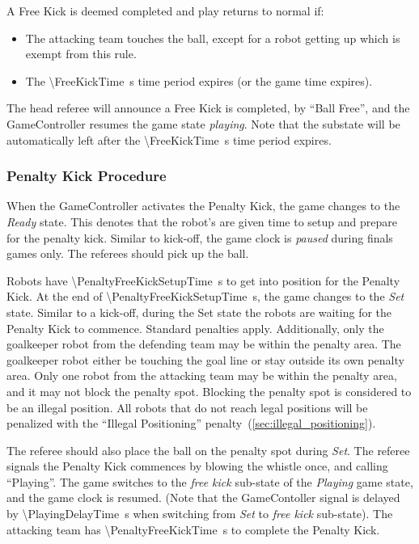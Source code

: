 A Free Kick is deemed completed and play returns to normal if:
\begin{itemize}
    \item The attacking team touches the ball, except for a robot getting up which is exempt from this rule.
    \item The \qty{\FreeKickTime}{\second} time period expires (or the game time expires).
\end{itemize}
The head referee will announce a Free Kick is completed, by ``Ball Free'', and the GameController resumes the game state \emph{playing}. Note that the substate will be automatically left after the \qty{\FreeKickTime}{\second} time period expires.

\subsubsection{Penalty Kick Procedure}
\label{sec:penalty_free_kick}

When the GameController activates the Penalty Kick, the game changes to the \textit{Ready} state.
This denotes that the robot's are given time to setup and prepare for the penalty kick.
Similar to kick-off, the game clock is \textit{paused} during finals games only.
The referees should pick up the ball.

Robots have \qty{\PenaltyFreeKickSetupTime}{\second} to get into position for the Penalty Kick. At the end of \qty{\PenaltyFreeKickSetupTime}{\second}, the game changes to the \textit{Set} state.
Similar to a kick-off, during the Set state the robots are waiting for the Penalty Kick to commence.
Standard penalties apply.
Additionally, only the goalkeeper robot from the defending team may be within the penalty area. The goalkeeper robot either be touching the goal line or stay outside its own penalty area.
Only one robot from the attacking team may be within the penalty area, and it may not block the penalty spot.
Blocking the penalty spot is considered to be an illegal position.
All robots that do not reach legal positions will be penalized with the ``Illegal Positioning'' penalty~(\cf \cref{sec:illegal_positioning}).

The referee should also place the ball on the penalty spot during \textit{Set}.
The referee signals the Penalty Kick commences by blowing the whistle once, and calling ``Playing''.
The game switches to the \textit{free kick} sub-state of the \textit{Playing} game state, and the game clock is resumed.
(Note that the GameContoller signal is delayed by \qty{\PlayingDelayTime}{\second} when switching from \textit{Set} to \textit{free kick} sub-state).
The attacking team has \qty{\PenaltyFreeKickTime}{\second} to complete the Penalty Kick.

